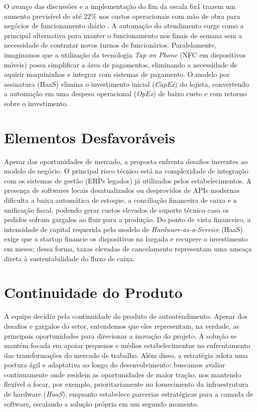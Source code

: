 \documentclass[a4paper]{article}
\begin{document}
O avanço das discussões e a implementação do fim da escala 6x1 trazem um aumento previsível de até 22\% nos custos operacionais com mão de obra para negócios de funcionamento diário \cite{fecomercio2026, abrasel2026}. A automação do atendimento surge como a principal alternativa para manter o funcionamento nos finais de semana sem a necessidade de contratar novos turnos de funcionários. Paralelamente, imaginamos que a utilização da tecnologia \textit{Tap on Phone} (NFC em dispositivos móveis) possa simplificar a área de pagamentos, eliminando a necessidade de aquirir maquininhas e integrar com sistemas de pagamento. O modelo por assinatura (HaaS) elimina o investimento inicial (\textit{CapEx}) do lojista, convertendo a automação em uma despesa operacional (\textit{OpEx}) de baixo custo e com retorno sobre o investimento.

\section{Elementos Desfavoráveis}

Apesar das oportunidades de mercado, a proposta enfrenta desafios inerentes ao modelo de negócio. O principal risco técnico está na complexidade de integração com os sistemas de gestão (ERPs legados) já utilizados pelos estabelecimentos. A presença de softwares locais desatualizados ou desprovidos de APIs modernas dificulta a baixa automática de estoque, a conciliação financeira de caixa e a unificação fiscal, podendo gerar custos elevados de suporte técnico caso os pedidos sofram gargalos ao fluir para a produção. Do ponto de vista financeiro, a intensidade de capital requerida pelo modelo de \textit{Hardware-as-a-Service} (HaaS) exige que a startup financie os dispositivos na largada e recupere o investimento em meses; dessa forma, taxas elevadas de cancelamento representam uma ameaça direta à sustentabilidade do fluxo de caixa.

\section{Continuidade do Produto}

A equipe decidiu pela continuidade do produto de autoatendimento. Apesar dos desafios e gargalos do setor, entendemos que eles representam, na verdade, as principais oportunidades para direcionar a inovação do projeto. A solução se mantém focada em apoiar pequenos e médios estabelecimentos no enfrentamento das transformações do mercado de trabalho. Além disso, a estratégia adota uma postura ágil e adaptativa ao longo do desenvolvimento: buscamos avaliar continuamente onde residem as oportunidades de maior tração, nos mantendo flexível a focar, por exemplo, prioritariamente no fornecimento da infraestrutura de hardware (\textit{HaaS}), enquanto estabelece parcerias estratégicas para a camada de software, escalando a solução própria em um segundo momento.
\end{document}
